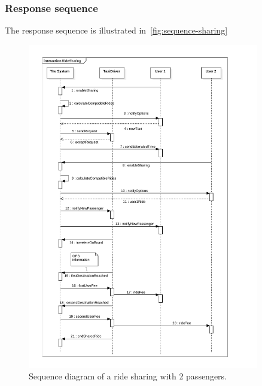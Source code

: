 \subsubsection{Response sequence}
The response sequence is illustrated in~\autoref{fig:sequence-sharing}

\begin{figure}
	\includegraphics[width=0.9\textwidth]{diagrams/sequence_ride_sharing.pdf}
	\caption{Sequence diagram of a ride sharing with 2 passengers.}
	\label{fig:sequence-sharing}
\end{figure}

